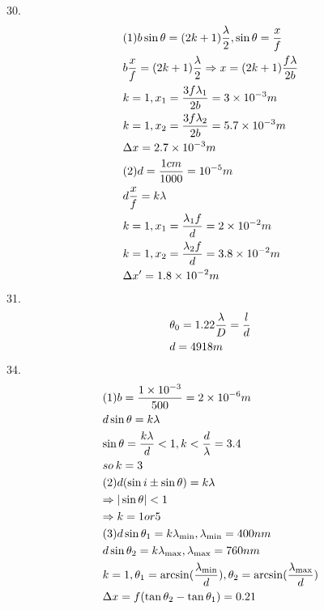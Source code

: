 \documentclass{article}
\begin{document}
30.\[\begin{gathered}
(1)b\sin \theta  = (2k + 1)\frac{\lambda }{2},\sin \theta  = \frac{x}{f} \hfill \\
b\frac{x}{f} = (2k + 1)\frac{\lambda }{2} \Rightarrow x = (2k + 1)\frac{{f\lambda }}{{2b}} \hfill \\
k = 1,{x_1} = \frac{{3f{\lambda _1}}}{{2b}} = 3 \times {10^{ - 3}}m \hfill \\
k = 1,{x_2} = \frac{{3f{\lambda _2}}}{{2b}} = 5.7 \times {10^{ - 3}}m \hfill \\
\Delta x = 2.7 \times {10^{ - 3}}m \hfill \\
(2)d = \frac{{1cm}}{{1000}} = {10^{ - 5}}m \hfill \\
d\frac{x}{f} = k\lambda  \hfill \\
k = 1,{x_1} = \frac{{{\lambda _1}f}}{d} = 2 \times {10^{ - 2}}m \hfill \\
k = 1,{x_2} = \frac{{{\lambda _2}f}}{d} = 3.8 \times {10^{ - 2}}m \hfill \\
\Delta x' = 1.8 \times {10^{ - 2}}m \hfill \\ 
\end{gathered} \]
31.\[\begin{gathered}
{\theta _0} = 1.22\frac{\lambda }{D} = \frac{l}{d} \hfill \\
d = 4918m \hfill \\ 
\end{gathered} \]
34.\[\begin{gathered}
(1)b = \frac{{1 \times {{10}^{ - 3}}}}{{500}} = 2 \times {10^{ - 6}}m \hfill \\
d\sin \theta  = k\lambda  \hfill \\
\sin \theta  = \frac{{k\lambda }}{d} < 1,k < \frac{d}{\lambda } = 3.4 \hfill \\
so{\kern 1pt} {\kern 1pt} k = 3 \hfill \\
(2)d(\sin i \pm \sin \theta ) = k\lambda  \hfill \\
\Rightarrow |\sin \theta | < 1 \hfill \\
\Rightarrow k = 1or5 \hfill \\
(3)d\sin {\theta _1} = k{\lambda _{\min }},{\lambda _{\min }} = 400nm \hfill \\
d\sin {\theta _2} = k{\lambda _{\max }},{\lambda _{\max }} = 760nm \hfill \\
k = 1,{\theta _1} = \arcsin (\frac{{{\lambda _{\min }}}}{d}),{\theta _2} = \arcsin (\frac{{{\lambda _{\max }}}}{d}) \hfill \\
\Delta x = f(\tan {\theta _2} - \tan {\theta _1}) = 0.21 \hfill \\ 
\end{gathered} \]
\end{document}
